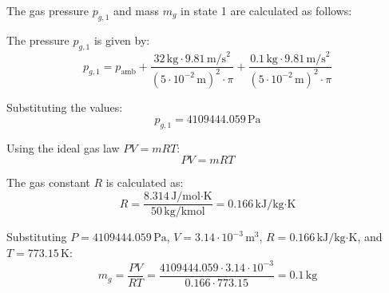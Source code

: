 The gas pressure \( p_{g,1} \) and mass \( m_g \) in state 1 are calculated as follows:  

The pressure \( p_{g,1} \) is given by:  
\[
p_{g,1} = p_{\text{amb}} + \frac{32 \, \text{kg} \cdot 9.81 \, \text{m/s}^2}{\left(5 \cdot 10^{-2} \, \text{m}\right)^2 \cdot \pi} + \frac{0.1 \, \text{kg} \cdot 9.81 \, \text{m/s}^2}{\left(5 \cdot 10^{-2} \, \text{m}\right)^2 \cdot \pi}
\]  

Substituting the values:  
\[
p_{g,1} = 4109444.059 \, \text{Pa}
\]  

Using the ideal gas law \( PV = mRT \):  
\[
PV = mRT
\]  

The gas constant \( R \) is calculated as:  
\[
R = \frac{8.314 \, \text{J/mol·K}}{50 \, \text{kg/kmol}} = 0.166 \, \text{kJ/kg·K}
\]  

Substituting \( P = 4109444.059 \, \text{Pa} \), \( V = 3.14 \cdot 10^{-3} \, \text{m}^3 \), \( R = 0.166 \, \text{kJ/kg·K} \), and \( T = 773.15 \, \text{K} \):  
\[
m_g = \frac{PV}{RT} = \frac{4109444.059 \cdot 3.14 \cdot 10^{-3}}{0.166 \cdot 773.15} = 0.1 \, \text{kg}
\]